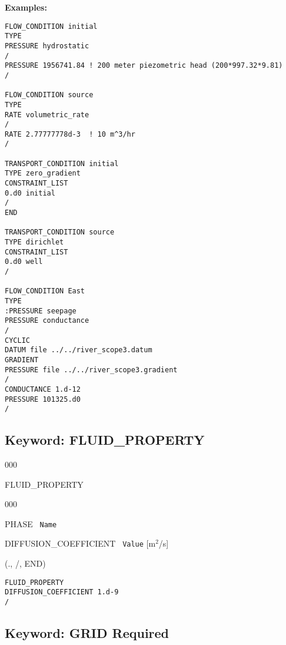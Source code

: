 \documentclass[12pt]{article}
\begin{document}
\bigskip

{\noindent\bf Examples:}
\begin{verbatim}
FLOW_CONDITION initial
TYPE
PRESSURE hydrostatic
/
PRESSURE 1956741.84 ! 200 meter piezometric head (200*997.32*9.81)
/

FLOW_CONDITION source
TYPE
RATE volumetric_rate
/
RATE 2.77777778d-3  ! 10 m^3/hr
/

TRANSPORT_CONDITION initial
TYPE zero_gradient
CONSTRAINT_LIST
0.d0 initial
/
END

TRANSPORT_CONDITION source
TYPE dirichlet
CONSTRAINT_LIST
0.d0 well
/

FLOW_CONDITION East
TYPE
:PRESSURE seepage
PRESSURE conductance
/
CYCLIC
DATUM file ../../river_scope3.datum
GRADIENT
PRESSURE file ../../river_scope3.gradient
/
CONDUCTANCE 1.d-12
PRESSURE 101325.d0
/
\end{verbatim}


\newpage
\protect\hypertarget{target_fluid_property}{}

\subsection{Keyword: FLUID\_PROPERTY}


\begin{deflist}{000}
\item[FLUID\_PROPERTY]~
\begin{deflist}{000}
\item[PHASE] \ {\tt Name}
\item[DIFFUSION\_COEFFICIENT] \ {\tt Value} [m$^2$/s]
\end{deflist}
\item[(., /, END)]
\end{deflist}


\begin{verbatim}
FLUID_PROPERTY
DIFFUSION_COEFFICIENT 1.d-9
/
\end{verbatim}


\newpage
\protect\hypertarget{target_grid}{}

\subsection{Keyword: GRID \hfill Required}
\end{document}
